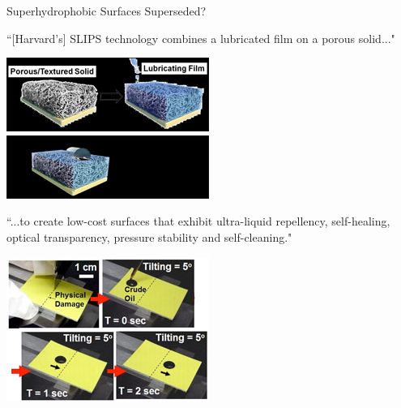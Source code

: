 \documentclass{beamer}
\begin{document}
\begin{frame}{Superhydrophobic Surfaces Superseded?}

``[Harvard's] SLIPS technology combines a lubricated film on a porous solid..."
\begin{center}
\includegraphics[scale=0.5]{slips-1a-250x91.jpg}
\phantom{word}
\includegraphics[scale=0.5]{slips-1b-250x78.jpg}
\end{center}

``...to create low-cost surfaces that exhibit ultra-liquid repellency, self-healing, optical transparency, pressure stability and self-cleaning."

\begin{center}
\includegraphics[scale=0.5]{slips-2-250x178.jpg}
\end{center}

\end{frame}
\end{document}
